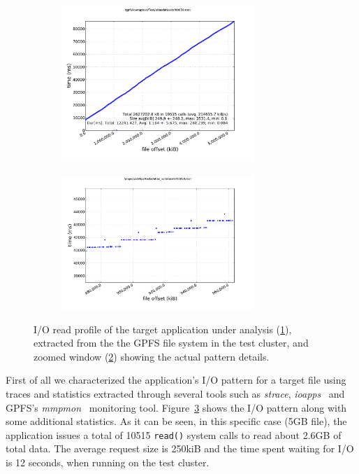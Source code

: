 \begin{figure}[!htb]
  \centering
  \begin{subfigure}[t]{0.8\textwidth}
    \centering
    \includegraphics[width=0.8\textwidth]{chapters/chapter2/figures/iopat_profile}
    \caption{\textit{}}
    \label{figure: iopat_profile}
  \end{subfigure}
  \begin{subfigure}[t]{0.8\textwidth}
    \centering
    \includegraphics[width=0.8\textwidth]{chapters/chapter2/figures/00050_zoom}
    \caption{\textit{}}
    \label{figure: iopat_zoom}
  \end{subfigure}
  \caption{I/O read profile of the target application under analysis (\ref{figure: iopat_profile}), extracted from the the GPFS file system in the test cluster, and zoomed window (\ref{figure: iopat_zoom}) showing the actual pattern details.}
  \label{figure: iopattern_with_statistics}
\end{figure}

First of all we characterized the application's I/O pattern for a target file using traces and statistics extracted through several tools such as \textit{strace}, \textit{ioapps}~\cite{ioapps} and GPFS's \textit{mmpmon}~\cite{mmpmon} monitoring tool. Figure~\ref{figure: iopattern_with_statistics} shows the I/O pattern along with some additional statistics. As it can be seen, in this specific case (5GB file), the application issues a total of 10515 \texttt{read()} system calls to read about 2.6GB of total data. The average request size is 250kiB and the time spent waiting for I/O is 12 seconds, when running on the test cluster. 

